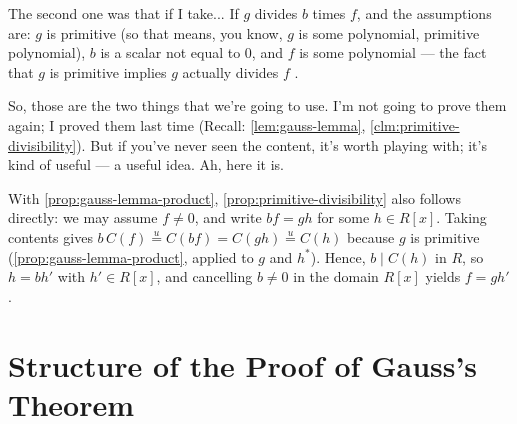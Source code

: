 \begin{speech}[00:10:17 - 00:11:19]
The second one was that if I take...  If $g$ divides $b$ times $f$, and the assumptions are: $g$ is primitive (so that means, you know, $g$ is some polynomial, primitive polynomial), $b$ is a scalar not equal to $0$, and $f$ is some polynomial  --- the fact that $g$ is primitive implies $g$ actually divides $f$ .

So, those are the two things that we're going to use. I'm not going to prove them again; I proved them last time (Recall: \cref{lem:gauss-lemma}, \cref{clm:primitive-divisibility}). But if you've never seen the content, it's worth playing with; it's kind of useful --- a useful idea. Ah, here it is.
\end{speech}

\begin{content}

\end{content}

\begin{aiNote}
With \cref{prop:gauss-lemma-product}, \cref{prop:primitive-divisibility} also follows directly: we may assume $f \neq 0$, and write $b f = g h$ for some $h \in R[x]$. Taking contents gives $b \, C(f) \stackrel{u}{=} C(b f) = C(g h) \stackrel{u}{=} C(h)$ because $g$ is primitive (\cref{prop:gauss-lemma-product}, applied to $g$ and $h^*$). Hence, $b \mid C(h)$ in $R$, so $h = b h'$ with $h' \in R[x]$, and cancelling $b \neq 0$ in the domain $R[x]$ yields $f = g h'$.
\end{aiNote}

\section{Structure of the Proof of Gauss's Theorem}

